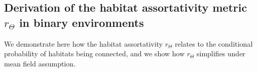 

\subsection{Derivation of the habitat assortativity metric $r_\Theta$ in binary environments}\label{sec:rtheta}
We demonstrate here how the habitat assortativity $r_\Theta$ relates to the conditional probability of habitats being connected, and we show how $r_\Theta$ simplifies under mean field assumption. 

